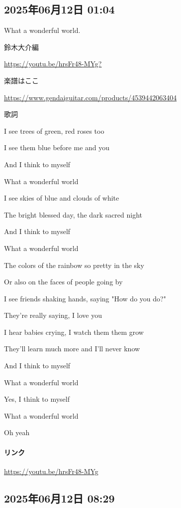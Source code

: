 \subsection*{2025年06月12日 01:04}

What a wonderful world.

鈴木大介編

\url{https://youtu.be/hrsFr48-MYg?}

楽譜はここ

\url{https://www.gendaiguitar.com/products/4539442063404}

歌詞

I see trees of green, red roses too

I see them blue before me and you

And I think to myself

What a wonderful world

I see skies of blue and clouds of white

The bright blessed day, the dark sacred night

And I think to myself

What a wonderful world

The colors of the rainbow so pretty in the sky

Or also on the faces of people going by

I see friends shaking hands, saying "How do you do?"

They're really saying, I love you

I hear babies crying, I watch them them grow

They'll learn much more and I'll never know

And I think to myself

What a wonderful world

Yes, I think to myself

What a wonderful world

Oh yeah

\paragraph{リンク}
\url{https://youtu.be/hrsFr48-MYg}

\subsection*{2025年06月12日 08:29}

